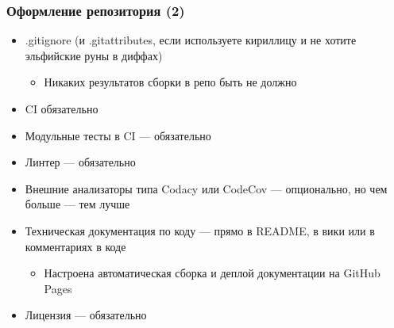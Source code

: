 \documentclass{../../slides-style}
\begin{document}
    \begin{frame}
        \frametitle{Оформление репозитория (2)}
        \begin{itemize}
            \item .gitignore (и .gitattributes, если используете кириллицу и не хотите эльфийские руны в диффах)
            \begin{itemize}
                \item Никаких результатов сборки в репо быть не должно
            \end{itemize}
            \item CI обязательно
            \item Модульные тесты в CI --- обязательно
            \item Линтер --- обязательно
            \item Внешние анализаторы типа Codacy или CodeCov --- опционально, но чем больше --- тем лучше
            \item Техническая документация по коду --- прямо в README, в вики или в комментариях в коде
            \begin{itemize}
                \item Настроена автоматическая сборка и деплой документации на GitHub Pages
            \end{itemize}
            \item Лицензия --- обязательно
        \end{itemize}
    \end{frame}
\end{document}
